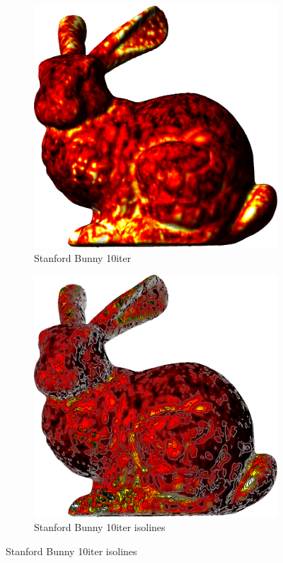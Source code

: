 \begin{figure}[ht]
{	\bigskip
	\begin{subfigure}[b]{0.48\linewidth}
		\includegraphics[width=1.0\linewidth,height=0.3\textheight,keepaspectratio]{data/acquired_meshes/bun_zipper_edited_r1_n4_v256_funcvals_10iter.png}
		\caption{Stanford Bunny 10iter}\label{fig:bun.c}
	\end{subfigure}
	\begin{subfigure}[b]{0.48\linewidth}
		\includegraphics[width=1.0\linewidth,height=0.3\textheight,keepaspectratio]{data/acquired_meshes/bun_zipper_edited_r1_n4_v256_funcvals_isolines_10iter.png}
		\caption{Stanford Bunny 10iter isolines}\label{fig:bun.d}
	\end{subfigure}

}
\end{figure}
